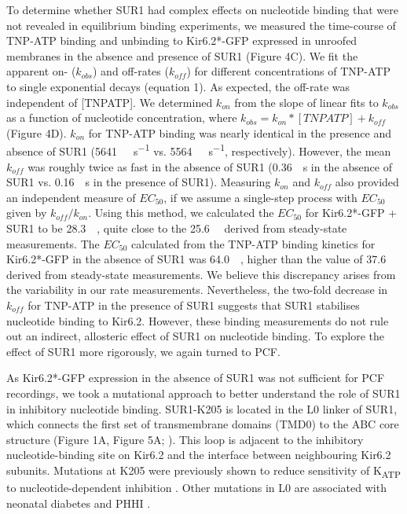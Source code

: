 \documentclass[9pt,lineno, onehalfspacing]{elife_modified}
\begin{document}
To determine whether SUR1 had complex effects on nucleotide binding that were not revealed in equilibrium binding experiments, we measured the time-course of TNP-ATP binding and unbinding to Kir6.2*-GFP expressed in unroofed membranes in the absence and presence of SUR1 (Figure 4C).
We fit the apparent on- ($k_{obs}$) and off-rates ($k_{off}$) for different concentrations of TNP-ATP to single exponential decays (equation 1).
As expected, the off-rate was independent of [TNPATP].
We determined $k_{on}$ from the slope of linear fits to $k_{obs}$ as a function of nucleotide concentration, where $k_{obs} = k_{on}*[TNPATP] + k_{off}$ (Figure 4D).
$k_{on}$ for TNP-ATP binding was nearly identical in the presence and absence of SUR1 (\SI{5641}{\per\Molar\per\second} vs. \SI{5564}{\per\Molar\per\second}, respectively).
However, the mean $k_{off}$ was roughly twice as fast in the absence of SUR1 (\SI{0.36}{\per\second} in the absence of SUR1 vs. \SI{0.16}{\per\second} in the presence of SUR1).
Measuring $k_{on}$ and $k_{off}$ also provided an independent measure of $EC_{50}$, if we assume a single-step process with $EC_{50}$ given by $k_{off}/k_{on}$.
Using this method, we calculated the $EC_{50}$ for Kir6.2*-GFP + SUR1 to be \SI{28.3}{\micro\Molar}, quite close to the \SI{25.6}{\micro\Molar} derived from steady-state measurements.
The $EC_{50}$ calculated from the TNP-ATP binding kinetics for Kir6.2*-GFP in the absence of SUR1 was \SI{64.0}{\micro\Molar}, higher than the value of \SI{37.6}{\micro\Molar} derived from steady-state measurements.
We believe this discrepancy arises from the variability in our rate measurements.
Nevertheless, the two-fold decrease in $k_{off}$ for TNP-ATP in the presence of SUR1 suggests that SUR1 stabilises nucleotide binding to Kir6.2.
However, these binding measurements do not rule out an indirect, allosteric effect of SUR1 on nucleotide binding.
To explore the effect of SUR1 more rigorously, we again turned to PCF.

As Kir6.2*-GFP expression in the absence of SUR1 was not sufficient for PCF recordings, we took a mutational approach to better understand the role of SUR1 in inhibitory nucleotide binding.
SUR1-K205 is located in the L0 linker of SUR1, which connects the first set of transmembrane domains (TMD0) to the ABC core structure (Figure 1A, Figure 5A; \cite{RN6, RN7}).
This loop is adjacent to the inhibitory nucleotide-binding site on Kir6.2 and the interface between neighbouring Kir6.2 subunits.
Mutations at K205 were previously shown to reduce sensitivity of K\textsubscript{ATP} to nucleotide-dependent inhibition \citep{RN95; RN96}.
Other mutations in L0 are associated with neonatal diabetes \citep{RN15} and PHHI \citep{RN100}.
\end{document}
